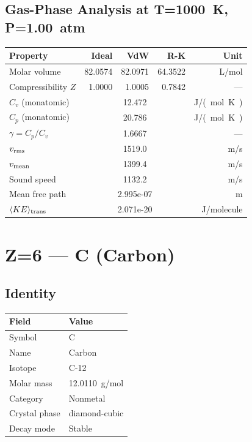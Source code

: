 \documentclass[11pt,a4paper]{article}
\begin{document}
\subsection{Gas-Phase Analysis at T=\SI{1000}{K}, P=\SI{1.00}{atm}}
\begin{tabular}{lrrrr}
  \toprule
  Property & Ideal & VdW & R-K & Unit \\
  \midrule
  Molar volume & 82.0574 & 82.0971 & 64.3522 & \si{L/mol} \\
  Compressibility $Z$ & 1.0000 & 1.0005 & 0.7842 & --- \\
  \midrule
  $C_v$ (monatomic) & \multicolumn{3}{c}{12.472} & \si{J/(mol.K)} \\
  $C_p$ (monatomic) & \multicolumn{3}{c}{20.786} & \si{J/(mol.K)} \\
  $\gamma = C_p/C_v$ & \multicolumn{3}{c}{1.6667} & --- \\
  $v_{\rm rms}$ & \multicolumn{3}{c}{1519.0} & \si{m/s} \\
  $v_{\rm mean}$ & \multicolumn{3}{c}{1399.4} & \si{m/s} \\
  Sound speed & \multicolumn{3}{c}{1132.2} & \si{m/s} \\
  Mean free path & \multicolumn{3}{c}{2.995e-07} & \si{m} \\
  $\langle KE \rangle_{\rm trans}$ & \multicolumn{3}{c}{2.071e-20} & \si{J/molecule} \\
  \bottomrule
\end{tabular}

\newpage

\section{Z=6 --- C (Carbon)}
\label{sec:Z6}

\subsection{Identity}
\begin{tabular}{ll}
  \toprule
  Field & Value \\
  \midrule
  Symbol & C \\
  Name & Carbon \\
  Isotope & C-12 \\
  Molar mass & \SI{12.0110}{g/mol} \\
  Category & Nonmetal \\
  Crystal phase & diamond-cubic \\
  Decay mode & Stable \\
  \bottomrule
\end{tabular}
\end{document}
